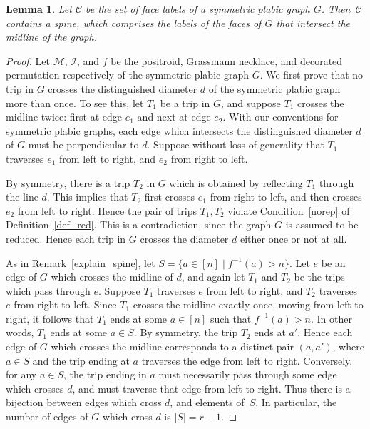 \documentclass[10pt]{amsart}
\newtheorem{lemm}[theo]{Lemma}
\theoremstyle{definition}
\begin{document}
\begin{lemm}
\label{has_spine}
Let $\mathcal{C}$ be the set of face labels of a symmetric plabic graph $G$. Then~$\mathcal{C}$ contains a spine, which comprises the labels of the faces of $G$ that intersect the midline of the graph. 
\end{lemm}

\begin{proof}
Let $\mathcal{M}$, $\mathcal{I}$, and $f$ be the positroid, Grassmann necklace, and decorated permutation respectively of the symmetric plabic graph $G$. We first prove that no trip in $G$ crosses the distinguished diameter $d$ of the symmetric plabic graph more than once. To see this, let $T_1$ be a trip in $G$, and suppose $T_1$ crosses the midline twice: first at edge $e_1$ and next at edge $e_2$. With our conventions for symmetric plabic graphs, each edge which intersects the distinguished diameter $d$ of $G$ must be perpendicular to $d$. Suppose without loss of generality that $T_1$ traverses $e_1$ from left to right, and $e_2$ from right to left. 

By symmetry, there is a trip $T_2$ in $G$ which is obtained by reflecting $T_1$ through the line $d$. This implies that $T_2$ first crosses $e_1$ from right to left, and then crosses $e_2$ from left to right. Hence the pair of trips $T_1, T_2$ violate Condition~\eqref{norep} of Definition~\ref{def_red}. This is a contradiction, since the graph $G$ is assumed to be reduced. Hence each trip in $G$ crosses the diameter $d$ either once or not at all.

As in Remark~\ref{explain_spine}, let $S = \{a \in [n] \mid f^{-1}(a) > n\}$. Let $e$ be an edge of $G$ which crosses the midline of $d$, and again let $T_1$ and $T_2$ be the trips which pass through $e$. Suppose $T_1$ traverses $e$ from left to right, and $T_2$ traverses $e$ from right to left. Since $T_1$ crosses the midline exactly once, moving from left to right, it follows that $T_1$ ends at some $a \in [n]$ such that $f^{-1}(a) > n$. In other words, $T_1$ ends at some $a \in S$. By symmetry, the trip $T_2$ ends at $a'$. Hence each edge of $G$ which crosses the midline corresponds to a distinct pair $(a,a')$, where $a \in S$ and the trip ending at $a$ traverses the edge from left to right. Conversely, for any $a \in S$, the trip ending in $a$ must necessarily pass through some edge which crosses $d$, and must traverse that edge from left to right. Thus there is a bijection between edges which cross $d$, and elements of~$S$. In particular, the number of edges of $G$ which cross $d$ is $|S| = r - 1$.


\end{proof}
\end{document}
